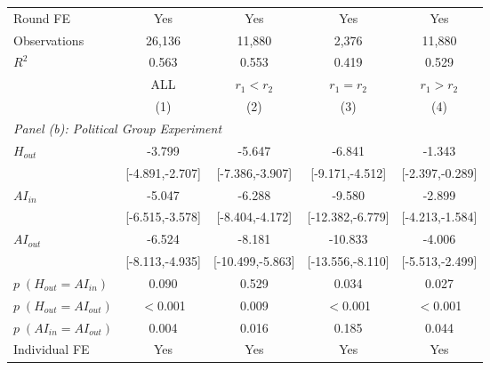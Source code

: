 \begin{table}[H]
\begin{threeparttable}
\begin{tabular}{l*{4}{c}}
Round FE    &                   Yes         &                   Yes         &                   Yes         &                   Yes         \\
Observations&                26,136         &                11,880         &                 2,376         &                11,880         \\
$R^2$       &                 0.563         &                 0.553         &                 0.419         &                 0.529         \\
\midrule\midrule
 & ALL & $r_1 < r_2$ & $r_1 = r_2$ & $r_1 > r_2$ \\
 & (1) & (2) & (3) & (4) \\
\midrule
\multicolumn{5}{l}{\textit{Panel (b): Political Group Experiment}} \\
$H_{out}$   &                -3.799\sym{***}&                -5.647\sym{***}&                -6.841\sym{***}&                -1.343\sym{*}  \\
            &       [-4.891,-2.707]         &       [-7.386,-3.907]         &       [-9.171,-4.512]         &       [-2.397,-0.289]         \\
\addlinespace
$AI_{in}$   &                -5.047\sym{***}&                -6.288\sym{***}&                -9.580\sym{***}&                -2.899\sym{***}\\
            &       [-6.515,-3.578]         &       [-8.404,-4.172]         &      [-12.382,-6.779]         &       [-4.213,-1.584]         \\
\addlinespace
$AI_{out}$  &                -6.524\sym{***}&                -8.181\sym{***}&               -10.833\sym{***}&                -4.006\sym{***}\\
            &       [-8.113,-4.935]         &      [-10.499,-5.863]         &      [-13.556,-8.110]         &       [-5.513,-2.499]         \\
\midrule
$p\;(H_{out} = AI_{in})$&                 0.090         &                 0.529         &                 0.034         &                 0.027         \\
$p\;(H_{out} = AI_{out})$&              $<$0.001         &                 0.009         &              $<$0.001         &              $<$0.001         \\
$p\;(AI_{in} = AI_{out})$&                 0.004         &                 0.016         &                 0.185         &                 0.044         \\
Individual FE&                   Yes         &                   Yes         &                   Yes         &                   Yes         \\

\end{tabular}
\end{threeparttable}
\end{table}
